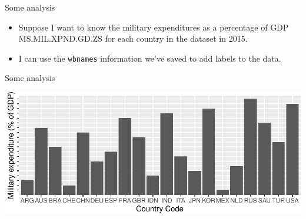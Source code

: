 \documentclass[10pt,ignorenonframetext,]{beamer}
\newenvironment{Shaded}{\begin{snugshade}}{\end{snugshade}}
\newcommand{\DataTypeTok}[1]{\textcolor[rgb]{0.13,0.29,0.53}{#1}}
\newcommand{\DecValTok}[1]{\textcolor[rgb]{0.00,0.00,0.81}{#1}}
\newcommand{\KeywordTok}[1]{\textcolor[rgb]{0.13,0.29,0.53}{\textbf{#1}}}
\newcommand{\NormalTok}[1]{#1}
\newcommand{\OperatorTok}[1]{\textcolor[rgb]{0.81,0.36,0.00}{\textbf{#1}}}
\newcommand{\StringTok}[1]{\textcolor[rgb]{0.31,0.60,0.02}{#1}}
\begin{document}
\begin{frame}[fragile]{Some analysis}
\protect\hypertarget{some-analysis}{}

\begin{itemize}
\item
  Suppose I want to know the military expenditures as a percentage of
  GDP MS.MIL.XPND.GD.ZS for each country in the dataset in 2015.
\item
  I can use the \texttt{wbnames} information we've saved to add labels
  to the data.
\end{itemize}

\begin{Shaded}
\end{Shaded}

\end{frame}

\begin{frame}{Some analysis}
\protect\hypertarget{some-analysis-1}{}

\includegraphics{PresentationTidyData_files/figure-beamer/unnamed-chunk-15-1.pdf}

\end{frame}
\end{document}
